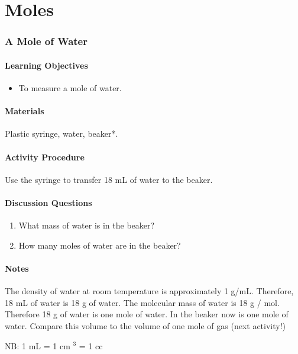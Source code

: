 \chapter{Moles}

\subsection{A Mole of Water}

\subsubsection*{Learning Objectives}
\begin{itemize}
\item{To measure a mole of water}.
\end{itemize}

\subsubsection*{Materials}
Plastic syringe, water, beaker*.

\subsubsection*{Activity Procedure}
Use the syringe to transfer 18 mL of water to the beaker.

\subsubsection*{Discussion Questions}
\begin{enumerate}
\item{What mass of water is in the beaker?}
\item{How many moles of water are in the beaker?}
\end{enumerate}

\subsubsection*{Notes}
The density of water at room temperature is approximately 1 g/mL. Therefore, 18 mL of water is 18 g of water. The molecular mass of water is 18 g / mol. Therefore 18 g of water is one mole of water. In the beaker now is one mole of water. Compare this volume to the volume of one mole of gas (next activity!)
\begin{center}
NB: 1 mL = 1 cm $^{3}$ = 1 cc
\end{center}

